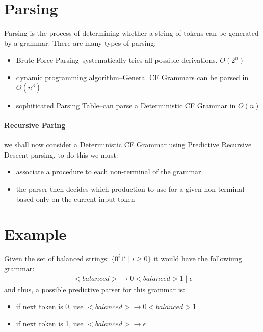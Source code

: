 \documentclass[12pt]{book}
\title{\coursetitle\linebreak\lecturename}
\author{\\Cain Susko\\ 
           \\ \\ \\
      Queen's University 
    \\School of Computing\\}
\begin{document}
\begin{titlepage}
        \maketitle
\end{titlepage}


\section*{Parsing}
Parsing is the process of determining whether a string of tokens can be
generated by a grammar. There are many types of parsing:
\begin{itemize}
        \item Brute Force Parsing--systematically tries all possible 
                derivations. $O(2^n)$
        \item dynamic programming algorithm--General CF Grammars can
                be parsed in $O(n^3)$ 
        \item sophiticated Parsing Table--can parse a Deterministic CF 
                Grammar in $O(n)$
\end{itemize}

\paragraph{Recursive Paring}
we shall now consider a Deterministic CF Grammar using Predictive
Recursive Descent parsing. to do this we must:
\begin{itemize}
        \item associate a procedure to each non-terminal of the grammar
        \item the parser then decides which production to use for a given 
                non-terminal based only on the current input token
\end{itemize}

\section*{Example}
Given the set of balanced strings: $\{0^i1^i \mid i \geq 0\}$
it would have the followiung grammar:
\begin{align*}
        <balanced> \to 0<balanced>1 \mid \epsilon
\end{align*}
and thus, a possible predictive parser for this grammar is:
\begin{itemize}
        \item if next token is 0, use $<balanced> \to 0<balanced>1$
        \item if next token is 1, use $<balanced> \to \epsilon$
\end{itemize}
\end{document}
